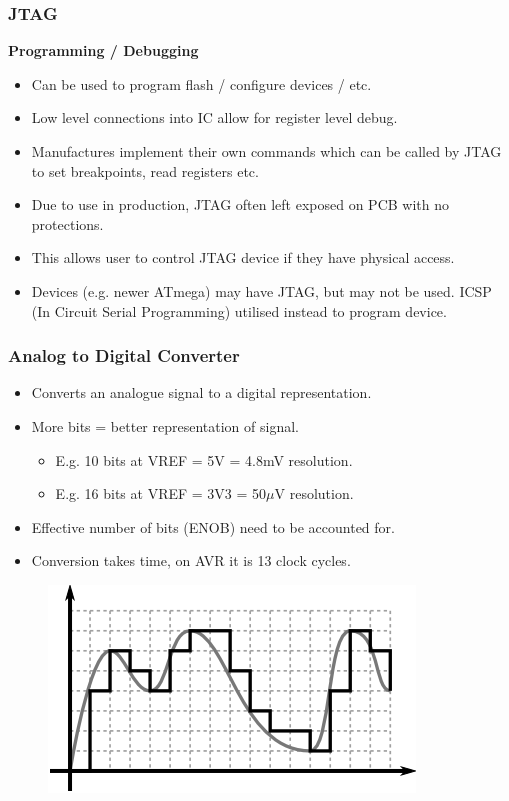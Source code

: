 \documentclass[t]{beamer}
\begin{document}

\begin{frame}[t]
\frametitle{JTAG}
\textbf{Programming / Debugging}
\begin{itemize}
	\item Can be used to program flash / configure devices / etc.
	\item Low level connections into IC allow for register level debug.
	\item Manufactures implement their own commands which can be called by JTAG to set breakpoints, read registers etc.
	\item Due to use in production, JTAG often left exposed on PCB with no protections. 
	\item This allows user to control JTAG device if they have physical access. 
	\item Devices (e.g. newer ATmega) may have JTAG, but may not be used. ICSP (In Circuit Serial Programming) utilised instead to program device. 
\end{itemize}

\end{frame}


\begin{frame}[t]
\frametitle{Analog to Digital Converter}
\begin{itemize}
	\item Converts an analogue signal to a digital representation. 
	\item More bits = better representation of signal. 
	\begin{itemize}
		\item E.g. 10 bits at VREF = 5V = 4.8mV resolution.
		\item E.g. 16 bits at VREF = 3V3 = 50$\mu$V resolution. 
	\end{itemize}
	\item Effective number of bits (ENOB) need to be accounted for. 
	\item Conversion takes time, on AVR it is 13 clock cycles. 
\end{itemize}

\begin{figure}
	\includegraphics[width=0.6\linewidth]{analogVSdigital.png}
\end{figure}
\end{frame}
\end{document}
